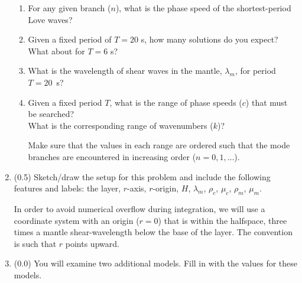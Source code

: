 \documentclass[11pt,titlepage,fleqn]{article}
\begin{document}
\begin{enumerate}
\begin{enumerate}
\item For any given branch ($n$), what is the phase speed of the shortest-period Love waves?

\item Given a fixed period of $T = 20$ s, how many solutions do you expect? \\
What about for $T = 6$ s? 

\item What is the wavelength of shear waves in the mantle, $\lambda_m$, for period $T = 20$~s?

\item Given a fixed period $T$, what is the range of phase speeds ($c$) that must be searched? \\
What is the corresponding range of wavenumbers ($k$)?

Make sure that the values in each range are ordered such that the mode branches are encountered in increasing order ($n = 0,1,\ldots$).

\end{enumerate}

\label{prob:model1}


\item (0.5) Sketch/draw the setup for this problem and include the following features and labels: the layer, $r$-axis, $r$-origin, $H$, $\lambda_m$, $\rho_c$, $\mu_c$, $\rho_m$, $\mu_m$.

In order to avoid numerical overflow during integration, we will use a coordinate system with an origin ($r = 0$) that is within the halfspace, three times a mantle shear-wavelength below the base of the layer. The convention is such that $r$ points upward.

\label{prob:setup}


\item (0.0) You will examine two additional models. Fill in  with the values for these models.


\end{enumerate}
\end{document}

